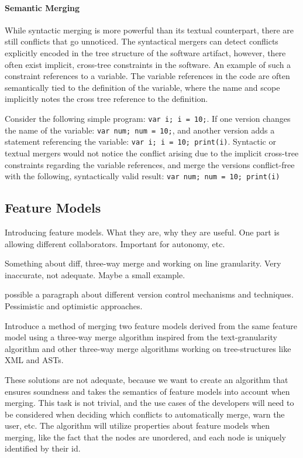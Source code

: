 \documentclass[a4paper,english]{ifimaster}
\begin{document}
\paragraph{Semantic Merging}%
\label{par:semantic_merging}

While syntactic merging is more powerful than its textual counterpart, there are still conflicts that go unnoticed. The syntactical mergers can detect conflicts explicitly encoded in the tree structure of the software artifact, however, there often exist implicit, cross-tree constraints in the software. An example of such a constraint references to a variable. The variable references in the code are often semantically tied to the definition of the variable, where the name and scope implicitly notes the cross tree reference to the definition. 

Consider the following simple program: \texttt{var i; i = 10;}. If one version changes the name of the variable: \texttt{var num; num = 10;}, and another version adds a statement referencing the variable: \texttt{var i; i = 10; print(i)}. Syntactic or textual mergers would not notice the conflict arising due to the implicit cross-tree constraints regarding the variable references, and merge the versions conflict-free with the following, syntactically valid result: \texttt{var num; num = 10; print(i)}

\subsection{Feature Models}%
\label{sub:feature_models}

Introducing feature models. What they are, why they are useful. One part is allowing different collaborators. Important for autonomy, etc.

Something about diff, three-way merge and working on line granularity. Very inaccurate, not adequate. Maybe a small example.

possible a paragraph about different version control mechanisms and techniques. Pessimistic and optimistic approaches. \parencite{cite:tom_mens_software_merging_survey}

Introduce a method of merging two feature models derived from the same feature model using a three-way merge algorithm inspired from the text-granularity algorithm and other three-way merge algorithms working on tree-structures like XML and ASTs.

These solutions are not adequate, because we want to create an algorithm that ensures soundness and takes the semantics of feature models into account when merging. This task is not trivial, and the use cases of the developers will need to be considered when deciding which conflicts to automatically merge, warn the user, etc. The algorithm will utilize properties about feature models when merging, like the fact that the nodes are unordered, and each node is uniquely identified by their id.
\end{document}
